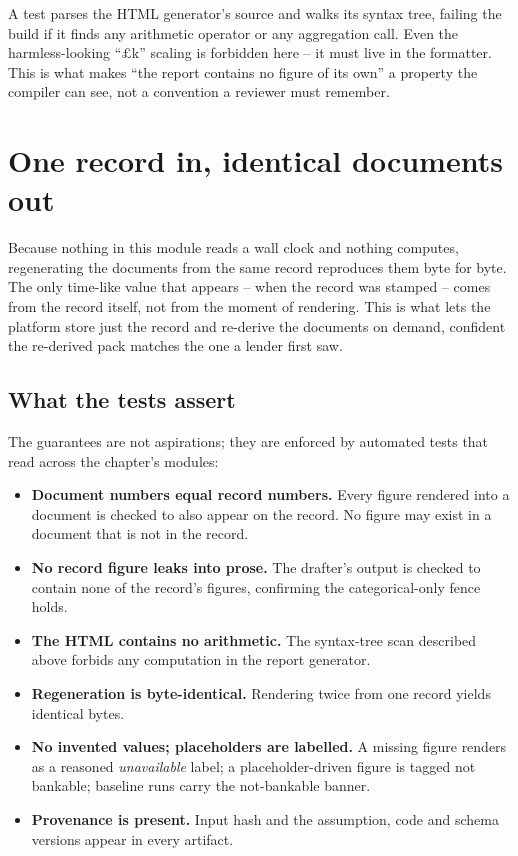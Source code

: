 \begin{caution}
A test parses the HTML generator's source and walks its syntax tree, failing the build if it finds any arithmetic operator or any aggregation call. Even the harmless-looking ``\(\pounds\)k'' scaling is forbidden here -- it must live in the formatter. This is what makes ``the report contains no figure of its own'' a property the compiler can see, not a convention a reviewer must remember.
\end{caution}

\section{One record in, identical documents out}

Because nothing in this module reads a wall clock and nothing computes, regenerating the documents from the same record reproduces them byte for byte. The only time-like value that appears -- when the record was stamped -- comes from the record itself, not from the moment of rendering. This is what lets the platform store just the record and re-derive the documents on demand, confident the re-derived pack matches the one a lender first saw.

\subsection{What the tests assert}
\label{sec:outputs-tests}

The guarantees are not aspirations; they are enforced by automated tests that read across the chapter's modules:

\begin{itemize}
  \item \textbf{Document numbers equal record numbers.} Every figure rendered into a document is checked to also appear on the record. No figure may exist in a document that is not in the record.
  \item \textbf{No record figure leaks into prose.} The drafter's output is checked to contain none of the record's figures, confirming the categorical-only fence holds.
  \item \textbf{The HTML contains no arithmetic.} The syntax-tree scan described above forbids any computation in the report generator.
  \item \textbf{Regeneration is byte-identical.} Rendering twice from one record yields identical bytes.
  \item \textbf{No invented values; placeholders are labelled.} A missing figure renders as a reasoned \emph{unavailable} label; a placeholder-driven figure is tagged not bankable; baseline runs carry the not-bankable banner.
  \item \textbf{Provenance is present.} Input hash and the assumption, code and schema versions appear in every artifact.
\end{itemize}

